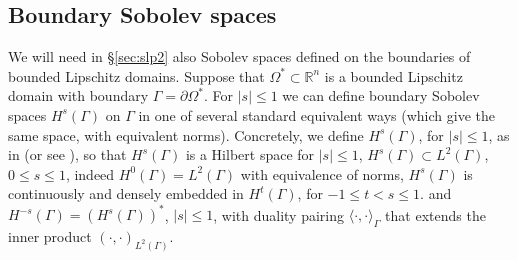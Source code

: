 \documentclass{birkjour}
\theoremstyle{definition}
\theoremstyle{remark}
\numberwithin{equation}{section}
\newcommand{\R}{\mathbb{R}}
\begin{document}


\subsection{Boundary Sobolev spaces} \label{sec:boundary}
We will need in \S\ref{sec:slp2} also Sobolev spaces defined on the boundaries of bounded Lipschitz domains. Suppose that $\Omega^{*}\subset \R^n$ is a bounded Lipschitz domain with boundary $\Gamma = \partial \Omega^{*}$. 
For $|s|\leq1$ we can define boundary Sobolev spaces $H^s(\Gamma)$ on $\Gamma$ in one of several standard equivalent ways (which give the same space, with equivalent norms). Concretely,  we define $H^s(\Gamma)$, for $|s|\leq 1$, as in  \cite[\S A.3]{chandler2012numerical} (or see \cite[pp.~98--99]{mclean2000strongly}), so that $H^s(\Gamma)$ is a Hilbert space for $|s|\leq 1$, $H^s(\Gamma)\subset L^2(\Gamma)$, $0\leq s\leq 1$, indeed $H^0(\Gamma)=L^2(\Gamma)$ with equivalence of norms, $H^s(\Gamma)$ is continuously and densely embedded in $H^t(\Gamma)$, for $-1\leq t< s\leq 1$. and $H^{-s}(\Gamma)=(H^s(\Gamma))^*$, $|s|\leq 1$, with duality pairing $\langle\cdot, \cdot \rangle_\Gamma$ that extends the inner product $(\cdot,\cdot)_{L^2(\Gamma)}$.
\end{document}

